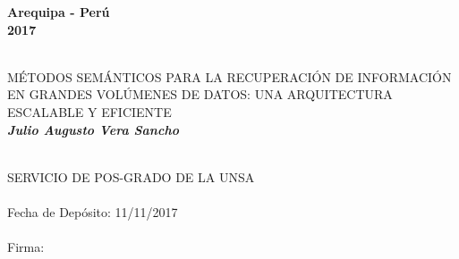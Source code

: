 \begin{titlepage}
\begin{center}
\begin{flushright}
\end{flushright}

\vspace*{2.5cm}
\begin{center}
\small
\textbf{Arequipa - Perú \\2017}
\end{center}
\cleardoublepage


\newpage





\vfill

\vspace*{5cm}

\begin{center}
\begin{minipage}[c]{12cm}
\begin{center}
\hrulefill\\
\vspace{.5cm} {\Large MÉTODOS SEMÁNTICOS PARA LA RECUPERACIÓN DE INFORMACIÓN EN GRANDES VOLÚMENES DE DATOS: UNA ARQUITECTURA ESCALABLE Y EFICIENTE}\\
\vspace{1.3cm}
\small\textbf{\it Julio Augusto Vera Sancho}\\
\vspace{.5cm}
\hrulefill\\
\end{center}
\end{minipage}
\end{center}

\vfill





\vspace*{10cm}
\begin{flushright}
\begin{Sbox}
\begin{minipage}{8.5cm}
\footnotesize
SERVICIO DE  POS-GRADO DE LA UNSA\\
\\
Fecha de Depósito:    11/11/2017\\
\\
Firma:\hrulefill
\end{minipage}
\end{Sbox}
\fbox{\TheSbox}
\end{flushright}






\end{center}
\end{titlepage}
